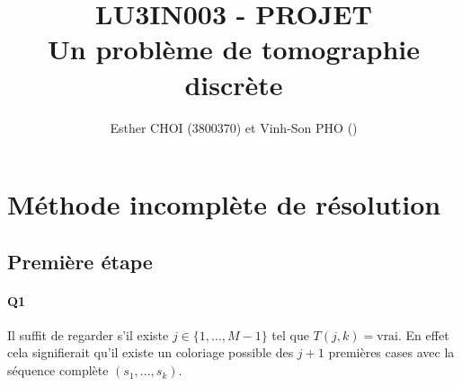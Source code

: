 \documentclass[12pt]{article}
\title{LU3IN003 - PROJET \\ Un problème de tomographie discrète\\}
\author{Esther CHOI (3800370) et Vinh-Son PHO ()}
\newcommand{\true}{\text{vrai}}
\begin{document}
	\maketitle
	\newpage
	
	\section{Méthode incomplète de résolution}
	
		\subsection{Première étape}
		
			\paragraph{Q1}
				Il suffit de regarder s'il existe $ j \in \{1,...,M-1\} $ tel que $ T(j,k) = \true $. En effet cela signifierait qu'il existe un coloriage possible des $ j+1 $ premières cases avec la séquence complète $ (s_1,...,s_k) $.
		
\end{document}

